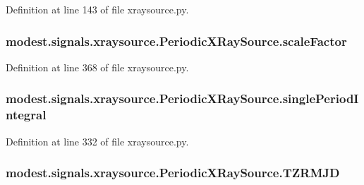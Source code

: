 Definition at line 143 of file xraysource.\+py.

\subsubsection[{\texorpdfstring{scale\+Factor}{scaleFactor}}]{\setlength{\rightskip}{0pt plus 5cm}modest.\+signals.\+xraysource.\+Periodic\+X\+Ray\+Source.\+scale\+Factor}\hypertarget{classmodest_1_1signals_1_1xraysource_1_1PeriodicXRaySource_a1f4469f0818f93136c6c228bd6fb5a09}{}\label{classmodest_1_1signals_1_1xraysource_1_1PeriodicXRaySource_a1f4469f0818f93136c6c228bd6fb5a09}


Definition at line 368 of file xraysource.\+py.

\subsubsection[{\texorpdfstring{single\+Period\+Integral}{singlePeriodIntegral}}]{\setlength{\rightskip}{0pt plus 5cm}modest.\+signals.\+xraysource.\+Periodic\+X\+Ray\+Source.\+single\+Period\+Integral}\hypertarget{classmodest_1_1signals_1_1xraysource_1_1PeriodicXRaySource_ab193c1d52a5bd8b0798bf407abcca72d}{}\label{classmodest_1_1signals_1_1xraysource_1_1PeriodicXRaySource_ab193c1d52a5bd8b0798bf407abcca72d}


Definition at line 332 of file xraysource.\+py.

\subsubsection[{\texorpdfstring{T\+Z\+R\+M\+JD}{TZRMJD}}]{\setlength{\rightskip}{0pt plus 5cm}modest.\+signals.\+xraysource.\+Periodic\+X\+Ray\+Source.\+T\+Z\+R\+M\+JD}\hypertarget{classmodest_1_1signals_1_1xraysource_1_1PeriodicXRaySource_aecd53533d34a4f821f4010c197edc2e8}{}\label{classmodest_1_1signals_1_1xraysource_1_1PeriodicXRaySource_aecd53533d34a4f821f4010c197edc2e8}


